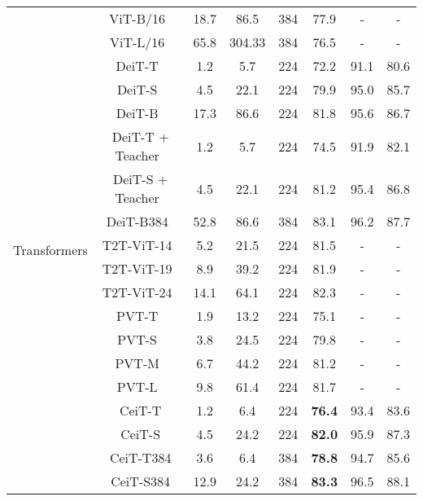\documentclass[10pt,twocolumn,letterpaper]{article}
\begin{document}
\begin{table*}[t]
\begin{tabular}{c|c|ccc|cc|c}
\midrule
        \multirow{22}{*}{Transformers}& ViT-B/16~\cite{dosovitskiy2021an} & 18.7 & 86.5 & 384 & 77.9 & - & - \\
        & ViT-L/16~\cite{dosovitskiy2021an} & 65.8 & 304.33 & 384 & 76.5 & - & - \\
        \cmidrule{2-8}
        & DeiT-T~\cite{DBLP:journals/corr/abs-2012-12877} & 1.2 & 5.7 & 224 & 72.2 & 91.1 & 80.6 \\
        & DeiT-S~\cite{DBLP:journals/corr/abs-2012-12877} & 4.5 & 22.1 & 224 & 79.9 & 95.0 & 85.7 \\
        & DeiT-B~\cite{DBLP:journals/corr/abs-2012-12877} & 17.3 & 86.6 & 224 & 81.8 & 95.6 & 86.7 \\
        & DeiT-T + Teacher~\cite{DBLP:journals/corr/abs-2012-12877} & 1.2 & 5.7 & 224 & 74.5 & 91.9 & 82.1 \\
        & DeiT-S + Teacher~\cite{DBLP:journals/corr/abs-2012-12877} & 4.5 & 22.1 & 224 & 81.2 & 95.4 & 86.8 \\
        \cmidrule{2-8}
        & DeiT-B384~\cite{DBLP:journals/corr/abs-2012-12877} & 52.8 & 86.6 & 384 & 83.1 & 96.2 & 87.7 \\
        \cmidrule{2-8}
        & T2T-ViT-14~\cite{DBLP:journals/corr/abs-2101-11986} & 5.2 & 21.5 & 224 & 81.5 & - & - \\
        & T2T-ViT-19~\cite{DBLP:journals/corr/abs-2101-11986} & 8.9 & 39.2 & 224 & 81.9 & - & - \\
        & T2T-ViT-24~\cite{DBLP:journals/corr/abs-2101-11986} & 14.1 & 64.1 & 224 & 82.3 & - & - \\
\cmidrule{2-8}
        & PVT-T~\cite{DBLP:journals/corr/abs-2102-12122} & 1.9 & 13.2 & 224 & 75.1 & - & - \\
        & PVT-S~\cite{DBLP:journals/corr/abs-2102-12122} & 3.8 & 24.5 & 224 & 79.8 & - & - \\
        & PVT-M~\cite{DBLP:journals/corr/abs-2102-12122} & 6.7 & 44.2 & 224 & 81.2 & - & - \\
        & PVT-L~\cite{DBLP:journals/corr/abs-2102-12122} & 9.8 & 61.4 & 224 & 81.7 & - & - \\
        \cmidrule{2-8}
        & CeiT-T & 1.2 & 6.4 & 224 & \textbf{76.4} & 93.4 & 83.6 \\
        & CeiT-S & 4.5 & 24.2 & 224 & \textbf{82.0} & 95.9 & 87.3 \\
\cmidrule{2-8}
        & CeiT-T384 & 3.6 & 6.4 & 384 & \textbf{78.8} & 94.7 & 85.6 \\
        & CeiT-S384 & 12.9 & 24.2 & 384 & \textbf{83.3} & 96.5 & 88.1 \\

\bottomrule
    \end{tabular}
    \label{tab:sota}
\end{table*}
\end{document}
